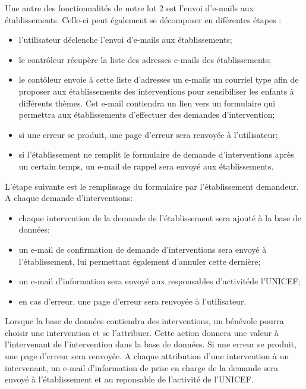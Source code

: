 Une autre des fonctionnalités de notre lot 2 est l'envoi d'e-mails aux établissements. Celle-ci peut également se décomposer en diférentes étapes : 
\begin{itemize}
	\item l'utilisateur déclenche l'envoi d'e-mails aux établissements; 
	\item le contrôleur récupère la liste des adresses e-mails des établissements;
	\item le contôleur envoie à cette liste d'adresses un e-mails un courriel type afin de proposer aux établissements des interventions pour sensibiliser les enfants à différents thèmes. Cet e-mail contiendra un lien vers un formulaire qui permettra aux établissements d'effectuer des demandes d'intervention;
	\item si une erreur se produit, une page d'erreur sera renvoyée à l'utilisateur;
	\item si l'établissement ne remplit le formulaire de demande d'interventions après un certain temps, un e-mail de rappel sera envoyé aux établissements. \\
\end{itemize}   


L'étape suivante est le remplissage du formulaire par l'établissement demandeur. A chaque demande d'interventions:  
\begin{itemize}
	\item chaque intervention de la demande de l'établissement sera ajouté à la base de données;
	\item un e-mail de confirmation de demande d'interventions sera envoyé à l'établissement, lui permettant également d'annuler cette dernière;
	\item un e-mail d'information sera envoyé aux responsables d'activitéde l'UNICEF;
	\item en cas d'erreur, une page d'erreur sera renvoyée à l'utilisateur.\\
\end{itemize}


Lorsque la base de données contiendra des interventions, un bénévole pourra choisir une intervention et se l'attribuer. Cette action donnera une valeur à l'intervenant de l'intervention dans la base de données. Si une erreur se produit, une page d'erreur sera renvoyée. A chaque attribution d'une intervention à un intervenant, un e-mail d'information de prise en charge de la demande sera envoyé à l'établissement et au reponsable de l'activité de l'UNICEF. \\

